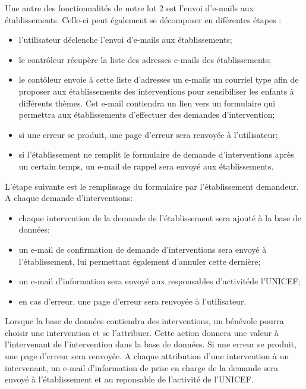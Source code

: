 Une autre des fonctionnalités de notre lot 2 est l'envoi d'e-mails aux établissements. Celle-ci peut également se décomposer en diférentes étapes : 
\begin{itemize}
	\item l'utilisateur déclenche l'envoi d'e-mails aux établissements; 
	\item le contrôleur récupère la liste des adresses e-mails des établissements;
	\item le contôleur envoie à cette liste d'adresses un e-mails un courriel type afin de proposer aux établissements des interventions pour sensibiliser les enfants à différents thèmes. Cet e-mail contiendra un lien vers un formulaire qui permettra aux établissements d'effectuer des demandes d'intervention;
	\item si une erreur se produit, une page d'erreur sera renvoyée à l'utilisateur;
	\item si l'établissement ne remplit le formulaire de demande d'interventions après un certain temps, un e-mail de rappel sera envoyé aux établissements. \\
\end{itemize}   


L'étape suivante est le remplissage du formulaire par l'établissement demandeur. A chaque demande d'interventions:  
\begin{itemize}
	\item chaque intervention de la demande de l'établissement sera ajouté à la base de données;
	\item un e-mail de confirmation de demande d'interventions sera envoyé à l'établissement, lui permettant également d'annuler cette dernière;
	\item un e-mail d'information sera envoyé aux responsables d'activitéde l'UNICEF;
	\item en cas d'erreur, une page d'erreur sera renvoyée à l'utilisateur.\\
\end{itemize}


Lorsque la base de données contiendra des interventions, un bénévole pourra choisir une intervention et se l'attribuer. Cette action donnera une valeur à l'intervenant de l'intervention dans la base de données. Si une erreur se produit, une page d'erreur sera renvoyée. A chaque attribution d'une intervention à un intervenant, un e-mail d'information de prise en charge de la demande sera envoyé à l'établissement et au reponsable de l'activité de l'UNICEF. \\

